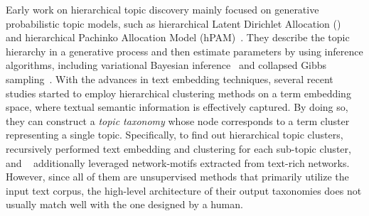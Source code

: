 
\label{subsec:taxogen}
Early work on hierarchical topic discovery mainly focused on generative probabilistic topic models, such as hierarchical Latent Dirichlet Allocation (\hlda)~\cite{blei2003hierarchical} and hierarchical Pachinko Allocation Model (hPAM)~\cite{mimno2007mixtures}.
They describe the topic hierarchy in a generative process and then estimate parameters by using inference algorithms, including variational Bayesian inference~\cite{blei2003latent} and collapsed Gibbs sampling~\cite{griffiths2004finding}.
With the advances in text embedding techniques, several recent studies started to employ hierarchical clustering methods on a term embedding space, where textual semantic information is effectively captured. 
By doing so, they can construct a \textit{topic taxonomy} whose node corresponds to a term cluster representing a single topic.
Specifically, to find out hierarchical topic clusters, \taxogen~\cite{zhang2018taxogen} recursively performed text embedding and clustering for each sub-topic cluster, and \nettaxo~\cite{shang2020nettaxo} additionally leveraged network-motifs extracted from text-rich networks.
However, since all of them are unsupervised methods that primarily utilize the input text corpus, the high-level architecture of their output taxonomies does not usually match well with the one designed by a human.


